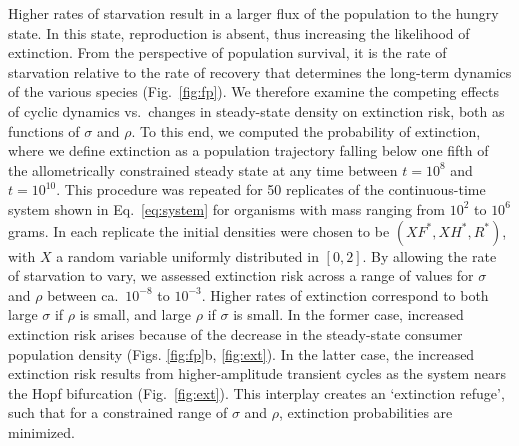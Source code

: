 \documentclass[twocolumn,preprintnumbers,amsmath,amssymb,superscriptaddress]{revtex4}
\begin{document}
Higher rates of starvation result in a larger flux of the population to the hungry state.
In this state, reproduction is absent, thus increasing the likelihood of extinction.  From the perspective of population survival, it is the rate of starvation relative to the rate of recovery that determines the long-term dynamics of the various species (Fig.~\ref{fig:fp}).
We therefore examine the competing effects of cyclic dynamics vs.\ changes in steady-state density on extinction risk, both as functions of $\sigma$ and $\rho$.
To this end, we computed the probability of extinction, where we define extinction as a population trajectory falling below one fifth of the allometrically constrained steady state at any time between $t=10^8$ and $t=10^{10}$.
This procedure was repeated for 50 replicates of the continuous-time system shown in Eq.~\ref{eq:system} for organisms with mass ranging from $10^2$ to $10^6$ grams.
In each replicate the initial densities were chosen to be $(XF^*,XH^*,R^*)$,
with $X$ a random variable uniformly distributed in $[0,2]$.  By allowing the
rate of starvation to vary, we assessed extinction risk across a range of
values for $\sigma$ and $\rho$ between ca.\ $10^{-8}$ to
$10^{-3}$. %
Higher rates of extinction correspond to both large $\sigma$ if $\rho$ is
small, and large $\rho$ if $\sigma$ is small.  In the former case, increased
extinction risk arises because of the decrease in the steady-state consumer
population density (Figs. \ref{fig:fp}b, \ref{fig:ext}).  In the latter case,
the increased extinction risk results from higher-amplitude transient cycles
as the system nears the Hopf bifurcation (Fig.~\ref{fig:ext}).  This
interplay creates an `extinction refuge', such that for a constrained range
of $\sigma$ and $\rho$, extinction probabilities are minimized.
\end{document}

